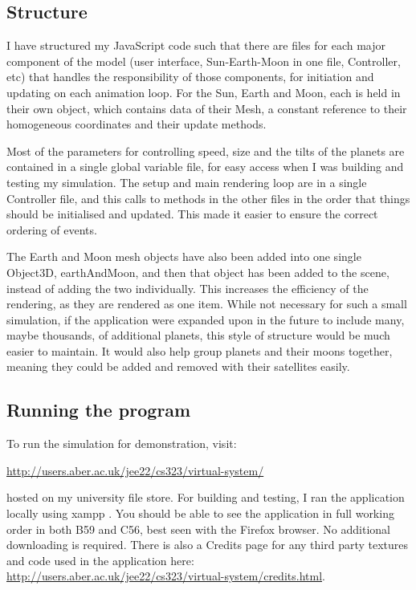 \documentclass[12pt]{article}
\begin{document}
\subsection{Structure}
I have structured my JavaScript code such that there are files for each major component of the model (user interface, Sun-Earth-Moon in one file, Controller, etc) that handles the responsibility of those components, for initiation and updating on each animation loop. For the Sun, Earth and Moon, each is held in their own object, which contains data of their Mesh, a constant reference to their homogeneous coordinates and their update methods.

Most of the parameters for controlling speed, size and the tilts of the planets are contained in a single global variable file, for easy access when I was building and testing my simulation. The setup and main rendering loop are in a single Controller file, and this calls to methods in the other files in the order that things should be initialised and updated. This made it easier to ensure the correct ordering of events.

The Earth and Moon mesh objects have also been added into one single Object3D, earthAndMoon, and then that object has been added to the scene, instead of adding the two individually. This increases the efficiency of the rendering, as they are rendered as one item. While not necessary for such a small simulation, if the application were expanded upon in the future to include many, maybe thousands, of additional planets, this style of structure would be much easier to maintain. It would also help group planets and their moons together, meaning they could be added and removed with their satellites easily.

\subsection{Running the program}
To run the simulation for demonstration, visit: 

\url{http://users.aber.ac.uk/jee22/cs323/virtual-system/}

hosted on my university file store. For building and testing, I ran the application locally using xampp\cite{xampp} . You should be able to see the application in full working order in both B59 and C56, best seen with the Firefox browser. No additional downloading is required. There is also a Credits page for any third party textures and code used in the application here: \url{http://users.aber.ac.uk/jee22/cs323/virtual-system/credits.html}.
\end{document}
